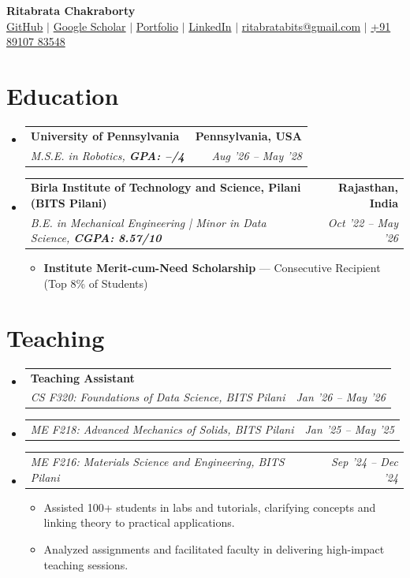\documentclass[letterpaper,10pt]{article}
\makeatletter
\newcommand{\resumeItem}[1]{
  \item \small{#1\vspace{-2pt}}
}
\newcommand{\resumeSubheading}[4]{
  \vspace{0pt}\item
  \begin{tabular*}{0.97\textwidth}[t]{l@{\extracolsep{\fill}}r}
    \textbf{#1} & \textbf{#2} \\
    \textit{\small #3} & \textit{\small #4} \\
  \end{tabular*}\vspace{-6pt}
}
\newcommand{\resumeSubSubheading}[2]{
  \vspace{0pt}\item
  \begin{tabular*}{0.97\textwidth}[t]{l@{\extracolsep{\fill}}r}
    \textit{\small #1} & \textit{\small #2} \\
  \end{tabular*}\vspace{-6pt}
}
\newcommand{\resumeSubHeadingListStart}{
  \begin{itemize}[leftmargin=0.10in, label={}]\vspace{6pt}
}
\newcommand{\resumeSubHeadingListEnd}{
  \end{itemize}
}
\newcommand{\resumeItemListStart}{
  \begin{itemize}[leftmargin=0.18in]
}
\newcommand{\resumeItemListEnd}{
  \end{itemize}\vspace{-6pt}
}
\makeatother
\begin{document}
\begin{center}
  \textbf{\huge Ritabrata Chakraborty} \\ [6pt]
  \small
  {\color{blue}\href{https://github.com/Ritabrata-Chakraborty}{GitHub} $|$
  \href{https://scholar.google.com/citations?user=JikCewwAAAAJ&hl=en}{Google Scholar} $|$
  \href{https://ritabrata-chakraborty.github.io/Portfolio/}{Portfolio} $|$
  \href{https://www.linkedin.com/in/ritabrata-chakraborty-a63268251/}{LinkedIn} $|$
  \href{mailto:ritabratabits@gmail.com}{ritabratabits@gmail.com} $|$ \href{tel:+918910783548}{+91 89107 83548}}
\end{center}

\section{Education}
\resumeSubHeadingListStart
  \resumeSubheading
    {University of Pennsylvania}{Pennsylvania, USA}
    {M.S.E. in Robotics, \textbf{GPA: --/4}}{Aug '26 – May '28}
  \resumeSubheading
    {Birla Institute of Technology and Science, Pilani (BITS Pilani)}{Rajasthan, India}
    {B.E. in Mechanical Engineering | Minor in Data Science, \textbf{CGPA: 8.57/10}}{Oct '22 – May '26}
    \resumeItemListStart
      \resumeItem{\textbf{Institute Merit-cum-Need Scholarship} — Consecutive Recipient (Top 8\% of Students)}
    \resumeItemListEnd
\resumeSubHeadingListEnd

\section{Teaching}
\resumeSubHeadingListStart
  \resumeSubheading
    {Teaching Assistant}{}
    {CS F320: Foundations of Data Science, BITS Pilani}{Jan '26 – May '26}

    \resumeSubSubheading
      {ME F218: Advanced Mechanics of Solids, BITS Pilani}{Jan '25 – May '25}

    \resumeSubSubheading
      {ME F216: Materials Science and Engineering, BITS Pilani}{Sep '24 – Dec '24}

  \resumeItemListStart
    \resumeItem{Assisted 100+ students in labs and tutorials, clarifying concepts and linking theory to practical applications.}
    \resumeItem{Analyzed assignments and facilitated faculty in delivering high-impact teaching sessions.}
  \resumeItemListEnd
\resumeSubHeadingListEnd

\end{document}
